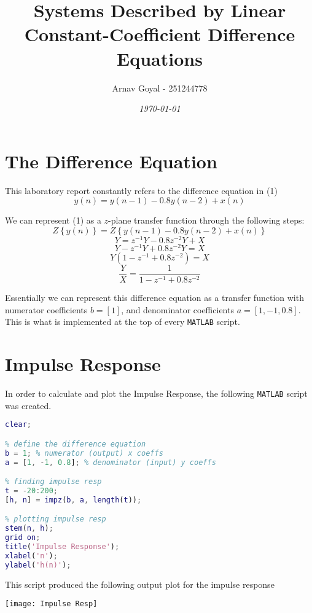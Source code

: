 \documentclass[]{report}
\title{\textbf{Systems Described by Linear Constant-Coefficient Difference Equations}}
\date{\textit{\today}}
\author{Arnav Goyal - 251244778}
\newcommand{\ztrans}[1]{Z\left\{ #1 \right\}}
\begin{document}
\maketitle
\section*{The Difference Equation}

This laboratory report constantly refers to the difference equation in (1)
\begin{equation}
	y(n) = y(n-1) - 0.8y(n-2) + x(n)
\end{equation}

We can represent (1) as a $z$-plane transfer function through the following steps:
	\[ \ztrans{y(n)} = \ztrans{ y(n-1) - 0.8y(n-2) + x(n) } \]
	\[ Y = z^{-1}Y -0.8z^{-2}Y + X	\]
	\[ Y - z^{-1}Y + 0.8z^{-2}Y = X	\]
	\[ Y\left( 1 - z^{-1} + 0.8z^{-2}\right) = X\]
	\[\frac{Y}{X} = \frac{1}{ 1 - z^{-1} + 0.8z^{-2}}\]

Essentially we can represent this difference equation as a transfer function with numerator coefficients $b = \left[	1\right]$, and denominator coefficients $a = \left[1, -1, 0.8\right]$. This is what is implemented at the top of every \texttt{MATLAB} script.

\section*{Impulse Response}

In order to calculate and plot the Impulse Response, the following \texttt{MATLAB} script was created.
\vspace{1em}

\begin{lstlisting}[frame=single, language=Matlab]
%% QUESTION 1
clear;

% define the difference equation
b = 1; % numerator (output) x coeffs
a = [1, -1, 0.8]; % denominator (input) y coeffs

% finding impulse resp
t = -20:200;
[h, n] = impz(b, a, length(t));

% plotting impulse resp
stem(n, h);
grid on;
title('Impulse Response');
xlabel('n');
ylabel('h(n)');
\end{lstlisting}

This script produced the following output plot for the impulse response
\vspace{1em}

\begin{center}
	\texttt{[image: Impulse Resp]}
\end{center}
\end{document}
